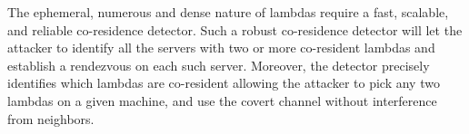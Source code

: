 The ephemeral, numerous and dense nature of lambdas require a fast,
scalable, and reliable co-residence detector. Such a robust co-residence 
detector will let the attacker to identify all the servers with two or more 
co-resident lambdas and establish a rendezvous on each such server. 
Moreover, the detector precisely identifies which lambdas are co-resident 
allowing the attacker to pick any two lambdas on a given machine, 
and use the covert channel without interference from neighbors. 



